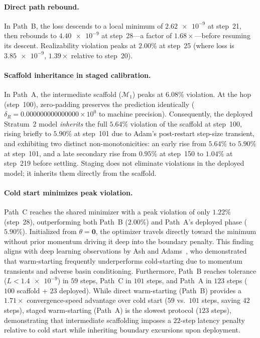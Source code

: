 \documentclass[preprint,aps,prb,longbibliography,superscriptaddress]{revtex4-2}
\begin{document}
\paragraph{Direct path rebound.}
In Path~B, the loss descends to a local minimum of $\num{2.62e-9}$ at step~21,
then rebounds to $\num{4.40e-9}$ at step~28---a factor of $1.68\times$---before
resuming its descent. Realizability violation peaks at $2.00\%$ at step~25
(where loss is $\num{3.85e-9}$, $1.39\times$ relative to step~20).

\paragraph{Scaffold inheritance in staged calibration.}
In Path~A, the intermediate scaffold ($\mathcal{M}_1$) peaks at $6.08\%$
violation. At the hop (step~100), zero-padding preserves the prediction
identically ($\delta_R = 0.000000000000000\times 10^0$ to machine precision).
Consequently, the deployed Stratum~2 model \emph{inherits} the full $5.64\%$
violation of the scaffold at step~100, rising briefly to $5.90\%$ at step~101
due to Adam's post-restart step-size transient, and exhibiting two distinct
non-monotonicities: an early rise from $5.64\%$ to $5.90\%$ at step~101, and
a late secondary rise from $0.95\%$ at step~150 to $1.04\%$ at step~219 before
settling. Staging does not eliminate violations in the deployed
model; it inherits them directly from the scaffold.

\paragraph{Cold start minimizes peak violation.}
Path~C reaches the shared minimizer with a peak violation of only $1.22\%$
(step~28), outperforming both Path~B ($2.00\%$) and Path~A's deployed phase
($5.90\%$). Initialized from $\theta = \mathbf{0}$, the optimizer travels
directly toward the minimum without prior momentum driving it deep into the
boundary penalty. This finding aligns with deep learning observations by
Ash and Adams~\cite{Ash2020}, who demonstrated that warm-starting frequently
underperforms cold-starting due to momentum transients and adverse basin conditioning.
Furthermore, Path~B reaches tolerance ($L < \num{1.4e-9}$) in
$59$ steps, Path~C in $101$ steps, and Path~A in $123$ steps ($100$ scaffold + $23$ deployed).
While direct warm-starting (Path~B) provides a $1.71\times$ convergence-speed advantage
over cold start ($59$ vs.\ $101$ steps, saving $42$ steps), staged warm-starting
(Path~A) is the slowest protocol ($123$ steps), demonstrating that intermediate
scaffolding imposes a $22$-step latency penalty relative to cold start while
inheriting boundary excursions upon deployment.
\end{document}
